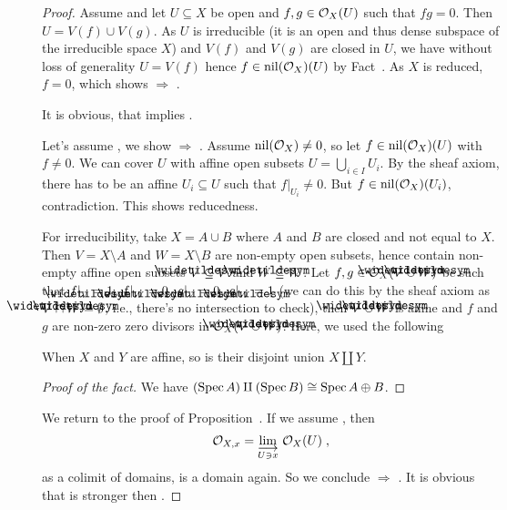 \documentclass[a4paper,parskip=half,numbers=enddot, DIV=12]{scrreprt}
\begin{document}
\begin{proof}
    Assume  and let $U\subseteq X$ be open and $f,g\in \mathcal{O}_X(U)$ such that $fg = 0$. Then $U = V(f)\cup V(g)$. As $U$ is irreducible (it is an open and thus dense subspace of the irreducible space $X$) and $V(f)$ and $V(g)$ are closed in $U$, we have without loss of generality $U = V(f)$ hence $f\in\operatorname{nil}(\mathcal{O}_X)(U)$ by Fact~. As $X$ is reduced, $f=0$, which shows  $\Rightarrow$ .
    
    It is obvious, that  implies .
    
    Let's assume , we show  $\Rightarrow$ . Assume $\operatorname{nil}(\mathcal{O}_X) \neq 0$, so let $f\in \operatorname{nil}(\mathcal{O}_X)(U)$ with $f\neq 0$. We can cover $U$ with affine open subsets $U=\bigcup_{i\in I}U_i$. By the sheaf axiom, there has to be an affine $U_i \subseteq U$ such that $f|_{U_i} \neq 0$. But $f\in \operatorname{nil}(\mathcal{O}_X)(U_i)$, contradiction. This shows reducedness. 
    
    For irreducibility, take $X=A\cup B$ where $A$ and $B$ are closed and not equal to $X$. Then $V=X\setminus A$ and $W= X\setminus B$ are non-empty open subsets, hence contain non-empty affine open subsets $\snake V \subseteq V$ and $\snake W \subseteq W$. Let $f,g\in \Oo_X(\snake V\cup\snake W)$ be such that $f|_{\snake V} = 1$, $f|_{\snake W} = 0$, $g|_{\snake V} = 0$, $g|_{\snake W} = 1$ (we can do this by the sheaf axiom as $\snake V\cap\snake W=\emptyset$, i.e., there's no intersection to check), then $\snake V\cup \snake W$ is affine and $f$ and $g$ are non-zero zero divisors in $\Oo_X(\snake V\cup \snake W)$. Here, we used the following 
    \begin{fact*}
    	When $X$ and $Y$ are affine, so is their disjoint union $X\amalg Y$.
    \end{fact*}
    \begin{proof}[Proof of the fact] 
    	We have $(\operatorname{Spec} A) \amalg (\operatorname{Spec} B) \cong \operatorname{Spec} A\oplus B$.
    \end{proof}
    
    We return to the proof of Proposition~. If we assume , then 
    \begin{align*}
        \Oo_{X,x} = \colimit[U\ni x] \Oo_X(U)\;,
    \end{align*}
    as a colimit of domains, is a domain again. So we conclude  $\Rightarrow$ . It is obvious that  is stronger then .
    

\end{proof}
\end{document}
